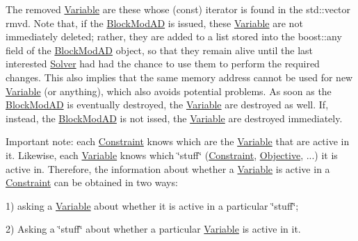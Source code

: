 The removed \mbox{\hyperlink{class_s_m_spp__di__unipi__it_1_1_variable}{Variable}} are these whose (const) iterator is found in the std\+::vector rmvd. Note that, if the \mbox{\hyperlink{class_s_m_spp__di__unipi__it_1_1_block_mod_a_d}{Block\+Mod\+AD}} is issued, these \mbox{\hyperlink{class_s_m_spp__di__unipi__it_1_1_variable}{Variable}} are not immediately deleted; rather, they are added to a list stored into the boost\+::any field of the \mbox{\hyperlink{class_s_m_spp__di__unipi__it_1_1_block_mod_a_d}{Block\+Mod\+AD}} object, so that they remain alive until the last interested \mbox{\hyperlink{class_s_m_spp__di__unipi__it_1_1_solver}{Solver}} had had the chance to use them to perform the required changes. This also implies that the same memory address cannot be used for new \mbox{\hyperlink{class_s_m_spp__di__unipi__it_1_1_variable}{Variable}} (or anything), which also avoids potential problems. As soon as the \mbox{\hyperlink{class_s_m_spp__di__unipi__it_1_1_block_mod_a_d}{Block\+Mod\+AD}} is eventually destroyed, the \mbox{\hyperlink{class_s_m_spp__di__unipi__it_1_1_variable}{Variable}} are destroyed as well. If, instead, the \mbox{\hyperlink{class_s_m_spp__di__unipi__it_1_1_block_mod_a_d}{Block\+Mod\+AD}} is not issed, the \mbox{\hyperlink{class_s_m_spp__di__unipi__it_1_1_variable}{Variable}} are destroyed immediately.

Important note\+: each \mbox{\hyperlink{class_s_m_spp__di__unipi__it_1_1_constraint}{Constraint}} knows which are the \mbox{\hyperlink{class_s_m_spp__di__unipi__it_1_1_variable}{Variable}} that are active in it. Likewise, each \mbox{\hyperlink{class_s_m_spp__di__unipi__it_1_1_variable}{Variable}} knows which \char`\"{}stuff\char`\"{} (\mbox{\hyperlink{class_s_m_spp__di__unipi__it_1_1_constraint}{Constraint}}, \mbox{\hyperlink{class_s_m_spp__di__unipi__it_1_1_objective}{Objective}}, ...) it is active in. Therefore, the information about whether a \mbox{\hyperlink{class_s_m_spp__di__unipi__it_1_1_variable}{Variable}} is active in a \mbox{\hyperlink{class_s_m_spp__di__unipi__it_1_1_constraint}{Constraint}} can be obtained in two ways\+:

1) asking a \mbox{\hyperlink{class_s_m_spp__di__unipi__it_1_1_variable}{Variable}} about whether it is active in a particular \char`\"{}stuff\char`\"{};

2) Asking a \char`\"{}stuff\char`\"{} about whether a particular \mbox{\hyperlink{class_s_m_spp__di__unipi__it_1_1_variable}{Variable}} is active in it.

